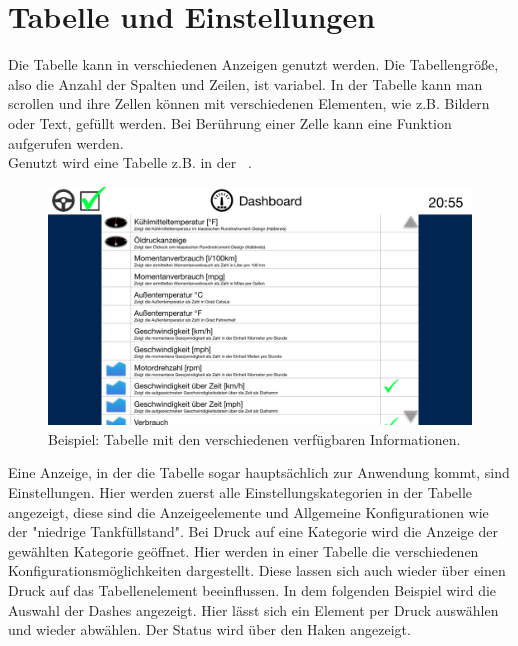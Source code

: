 \documentclass[pflichtenheft.tex]{subfiles}
\begin{document}
\clearpage
\section{Tabelle und Einstellungen}

Die Tabelle kann in verschiedenen Anzeigen genutzt werden. Die Tabellengröße, also die Anzahl der Spalten und Zeilen, ist variabel. In der Tabelle kann man scrollen und ihre Zellen können mit verschiedenen Elementen, wie z.B. Bildern oder Text, gefüllt werden. Bei Berührung einer Zelle kann eine Funktion aufgerufen werden.\\
Genutzt wird eine Tabelle z.B. in der ~. 

\begin{figure}[H]
  	\begin{center}
 		\includegraphics[width=\textwidth]{Images/GUI-Settings.png}
  		\caption{Beispiel: Tabelle mit den verschiedenen verfügbaren Informationen.}
  	\end{center}
\end{figure}


Eine Anzeige, in der die Tabelle sogar hauptsächlich zur Anwendung kommt, sind Einstellungen. Hier werden zuerst alle Einstellungskategorien in der Tabelle angezeigt, diese sind die Anzeigeelemente und Allgemeine Konfigurationen wie der "niedrige Tankfüllstand". Bei Druck auf eine Kategorie wird die Anzeige der gewählten Kategorie geöffnet. Hier werden in einer Tabelle die verschiedenen Konfigurationsmöglichkeiten dargestellt. Diese lassen sich auch wieder über einen Druck auf das Tabellenelement beeinflussen. 
In dem folgenden Beispiel wird die Auswahl der Dashes angezeigt. Hier lässt sich ein Element per Druck auswählen und wieder abwählen. Der Status wird über den Haken angezeigt.
\end{document}
